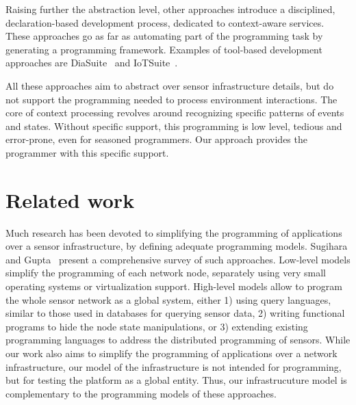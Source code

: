 Raising further the abstraction level, other approaches introduce a disciplined, declaration-based development process, dedicated to context-aware services.  These approaches go as far as automating part of the programming task by generating a programming framework. Examples of tool-based development approaches are DiaSuite~\cite{bertran2014diasuite,cassou2012toward} and IoTSuite~\cite{Patel2015}.

All these approaches aim to abstract over sensor infrastructure details, but do not support the programming needed to process environment interactions. The core of context processing revolves around recognizing specific patterns of events and states.  Without specific support, this programming is low level, tedious and error-prone, even for seasoned programmers. Our approach provides the programmer with this specific support.


\section{Related work}\label{sec:relatedwork}

Much research has been devoted to simplifying the programming of applications over a sensor infrastructure, by defining adequate programming models. Sugihara and Gupta~\cite{sugihara-gupta-08} present a comprehensive survey of such approaches. Low-level models simplify the programming of each network node, separately using very small operating systems or virtualization support. High-level models allow to program the whole sensor network as a global system, either 1) using query languages, similar to those used in databases for querying sensor data, 2) writing functional programs to hide the node state manipulations, or 3) extending existing programming languages to address the distributed programming of sensors. While our work also aims to simplify the programming of applications over a network infrastructure, our model of the infrastructure is not intended for programming, but for testing the platform as a global entity. Thus, our infrastrucuture model is complementary to the programming models of these approaches.

